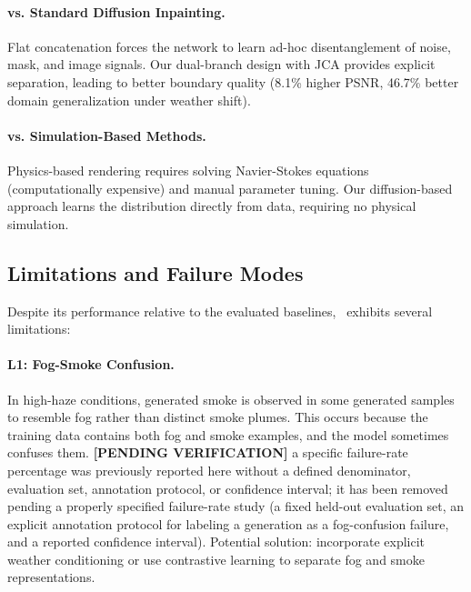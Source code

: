 \documentclass[journal]{IEEEtran}
\begin{document}
\paragraph{vs. Standard Diffusion Inpainting.}
Flat concatenation \cite{rombach2022highresolutionimagesynthesislatent, wang2024flamediffuserwildfireimage} forces the network to learn ad-hoc disentanglement of noise, mask, and image signals. Our dual-branch design with JCA provides explicit separation, leading to better boundary quality (8.1\% higher PSNR, 46.7\% better domain generalization under weather shift).

\paragraph{vs. Simulation-Based Methods.}
Physics-based rendering \cite{6053841} requires solving Navier-Stokes equations (computationally expensive) and manual parameter tuning. Our diffusion-based approach learns the distribution directly from data, requiring no physical simulation.

\subsection{Limitations and Failure Modes}
\label{sec:limitations}

Despite its performance relative to the evaluated baselines, \method~exhibits several limitations:

\paragraph{L1: Fog-Smoke Confusion.}
In high-haze conditions, generated smoke is observed in some generated
samples to resemble fog rather than distinct smoke plumes. This occurs
because the training data contains both fog and smoke examples, and the
model sometimes confuses them. \textbf{[PENDING VERIFICATION]} a specific
failure-rate percentage was previously reported here without a defined
denominator, evaluation set, annotation protocol, or confidence interval;
it has been removed pending a properly specified failure-rate study (a
fixed held-out evaluation set, an explicit annotation protocol for
labeling a generation as a fog-confusion failure, and a reported
confidence interval). Potential solution: incorporate explicit weather
conditioning or use contrastive learning to separate fog and smoke
representations.
\end{document}
